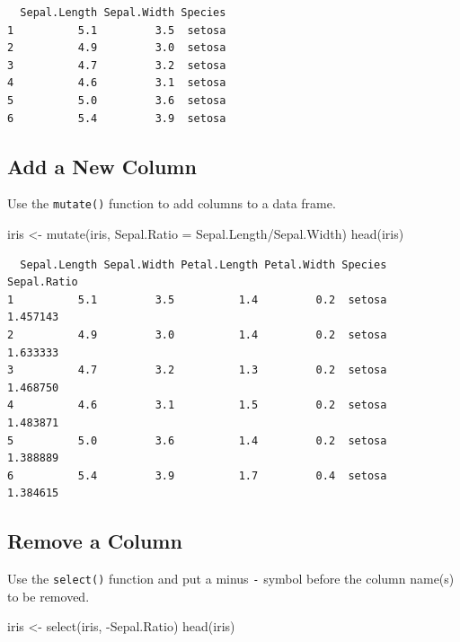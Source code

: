 \documentclass[
  letterpaper,
  DIV=11,
  numbers=noendperiod]{scrreprt}
\newenvironment{Shaded}{\begin{snugshade}}{\end{snugshade}}
\newcommand{\AttributeTok}[1]{\textcolor[rgb]{0.40,0.45,0.13}{#1}}
\newcommand{\FunctionTok}[1]{\textcolor[rgb]{0.28,0.35,0.67}{#1}}
\newcommand{\NormalTok}[1]{\textcolor[rgb]{0.00,0.23,0.31}{#1}}
\newcommand{\OtherTok}[1]{\textcolor[rgb]{0.00,0.23,0.31}{#1}}
\newcommand{\SpecialCharTok}[1]{\textcolor[rgb]{0.37,0.37,0.37}{#1}}
\begin{document}
\begin{verbatim}
  Sepal.Length Sepal.Width Species
1          5.1         3.5  setosa
2          4.9         3.0  setosa
3          4.7         3.2  setosa
4          4.6         3.1  setosa
5          5.0         3.6  setosa
6          5.4         3.9  setosa
\end{verbatim}

\subsection{Add a New Column}\label{add-a-new-column-1}

Use the \texttt{mutate()} function to add columns to a data frame.

\begin{Shaded}
\begin{Highlighting}[]
\NormalTok{iris }\OtherTok{\textless{}{-}} \FunctionTok{mutate}\NormalTok{(iris, }\AttributeTok{Sepal.Ratio =}\NormalTok{ Sepal.Length}\SpecialCharTok{/}\NormalTok{Sepal.Width)}
\FunctionTok{head}\NormalTok{(iris)}
\end{Highlighting}
\end{Shaded}

\begin{verbatim}
  Sepal.Length Sepal.Width Petal.Length Petal.Width Species Sepal.Ratio
1          5.1         3.5          1.4         0.2  setosa    1.457143
2          4.9         3.0          1.4         0.2  setosa    1.633333
3          4.7         3.2          1.3         0.2  setosa    1.468750
4          4.6         3.1          1.5         0.2  setosa    1.483871
5          5.0         3.6          1.4         0.2  setosa    1.388889
6          5.4         3.9          1.7         0.4  setosa    1.384615
\end{verbatim}

\subsection{Remove a Column}\label{remove-a-column-1}

Use the \texttt{select()} function and put a minus
\texttt{\textquotesingle{}-\textquotesingle{}} symbol before the column
name(s) to be removed.

\begin{Shaded}
\begin{Highlighting}[]
\NormalTok{iris }\OtherTok{\textless{}{-}} \FunctionTok{select}\NormalTok{(iris, }\SpecialCharTok{{-}}\NormalTok{Sepal.Ratio)}
\FunctionTok{head}\NormalTok{(iris)}
\end{Highlighting}
\end{Shaded}
\end{document}
